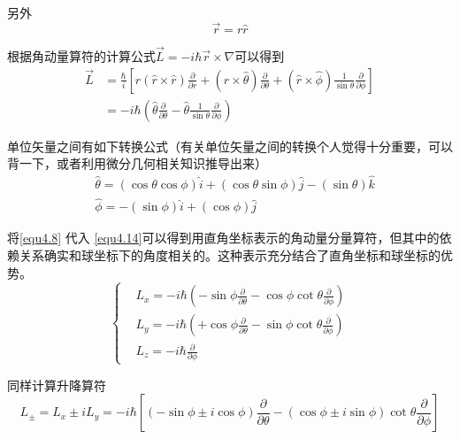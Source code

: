 \documentclass[UTF8]{ctexart}
\begin{document}
\noindent 另外
\begin{equation}
    \vec{r} = r \hat{r}
\end{equation}

\noindent 根据角动量算符的计算公式$\vec{L} = -i \hbar \vec{r} \times \nabla$可以得到 
\begin{equation}
    \begin{aligned}
        \vec{L}&=\frac{\hbar}{i}\left[r(\hat{r} \times \hat{r}) \frac{\partial}{\partial r}+(\hat{r} \times \hat{\theta}) \frac{\partial}{\partial \theta}+(\hat{r} \times \hat{\phi}) \frac{1}{\sin \theta} \frac{\partial}{\partial \phi}\right] \\
        &= - i \hbar \left(\hat{\theta} \frac{\partial}{\partial \theta} - \hat{\theta} \frac{1}{\sin \theta} \frac{\partial}{\partial \phi}\right)  
    \end{aligned}\label{equ4.14}
    \end{equation}

\noindent 单位矢量之间有如下转换公式（有关单位矢量之间的转换个人觉得十分重要，可以背一下，或者利用微分几何相关知识推导出来）
\begin{equation}
    \begin{aligned}
    &\hat{\theta}=(\cos \theta \cos \phi) \hat{i}+(\cos \theta \sin \phi) \hat{j}-(\sin \theta) \hat{k}\\
    &\hat{\phi}=-(\sin \phi) \hat{i}+(\cos \phi) \hat{j}
    \end{aligned}\label{equ4.8}
    \end{equation}

    将\autoref{equ4.8} 代入 \autoref{equ4.14}可以得到用直角坐标表示的角动量分量算符，但其中的依赖关系确实和球坐标下的角度相关的。这种表示充分结合了直角坐标和球坐标的优势。
    \begin{equation}
        \left \{ \begin{aligned}
            &L_x = -i \hbar \left(- \sin \phi \frac{\partial}{\partial \theta} - \cos \phi \cot \theta \frac{\partial}{\partial \phi}\right) \\
            &L_y = -i \hbar \left(+ \cos \phi \frac{\partial}{\partial \theta} - \sin \phi \cot \theta \frac{\partial}{\partial \phi}\right) \\
            &L_z = -i \hbar \frac{\partial}{\partial \phi}
        \end{aligned} \right.
    \end{equation}

    同样计算升降算符
    \begin{equation}
        L_{\pm}=L_{x} \pm i L_{y}=- i \hbar \left[(-\sin \phi \pm i \cos \phi) \frac{\partial}{\partial \theta}-(\cos \phi \pm i \sin \phi) \cot \theta \frac{\partial}{\partial \phi}\right]
        \end{equation}
\end{document}
